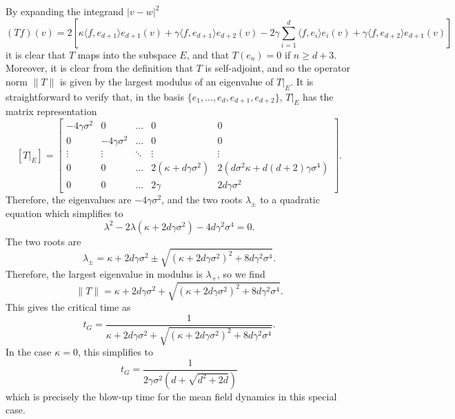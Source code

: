    By expanding the integrand $|v-w|^2$ \begin{equation*} 
       (Tf)(v)  = 2\left[\kappa\langle f, e_{d+1}\rangle e_{d+1}(v)
       +\gamma \langle f, e_{d+1}\rangle e_{d+2}(v)
       -2\gamma \sum_{i=1}^d \langle f, e_i\rangle e_i(v)
       +\gamma \langle f, e_{d+2}\rangle e_{d+1}(v)\right]
   \end{equation*} 
  it is clear that $T$ maps into the subspace $E$, and that $T(e_n)=0$ if $n\geq d+3.$ Moreover, it is clear from the definition that $T$ is self-adjoint, and so the operator norm $\|T\|$ is given by the largest modulus of an eigenvalue of $T|_E.$ It is straightforward to verify that, in the basis $\{e_1,...,e_d, e_{d+1}, e_{d+2}\}$, $T|_E$ has the matrix representation \begin{equation*}
       \left[T|_E\right]=\begin{bmatrix}
    -4\gamma\sigma^2 & 0  & \dots  & 0 &0 \\
    0 & -4\gamma\sigma^2  & \dots  & 0 &0\\
    \vdots & \vdots  & \ddots & \vdots &\vdots \\
    0 & 0  & \dots  & 2(\kappa+d\gamma\sigma^2) & 2(d\sigma^2\kappa+d(d+2)\gamma\sigma^4) \\ 
    0 & 0& \dots & 2\gamma & 2d\gamma \sigma^2
\end{bmatrix}.
   \end{equation*} Therefore, the eigenvalues are $-4\gamma \sigma^2$, and the two roots  $\lambda_\pm$ to a quadratic equation which simplifies to \begin{equation*}
       \lambda^2-2\lambda(\kappa+2d\gamma\sigma^2)-4d\gamma^2\sigma^4=0.
   \end{equation*} The two roots are \begin{equation}
       \lambda_\pm=\kappa +2d\gamma\sigma^2 \pm \sqrt{(\kappa+2d\gamma\sigma^2)^2+8d\gamma^2\sigma^4}.
   \end{equation} Therefore, the largest eigenvalue in modulus is $\lambda_+$, so we find \begin{equation*}
       \|T\|=\kappa +2d\gamma\sigma^2 + \sqrt{(\kappa+2d\gamma\sigma^2)^2+8d\gamma^2\sigma^4}.
   \end{equation*} This gives the critical time as \begin{equation}
       t_G= \frac{1}{\kappa +2d\gamma\sigma^2 + \sqrt{(\kappa+2d\gamma\sigma^2)^2+8d\gamma^2\sigma^4}}.
   \end{equation} In the case $\kappa=0$, this simplifies to \begin{equation*}
       t_G= \frac{1}{2\gamma\sigma^2(d+\sqrt{d^2+2d})}
   \end{equation*} which is precisely the blow-up time for the mean field dynamics in this special case.
   \begin{lemma}\label{lemma: the one I haven't done yet}
     \end{lemma}
